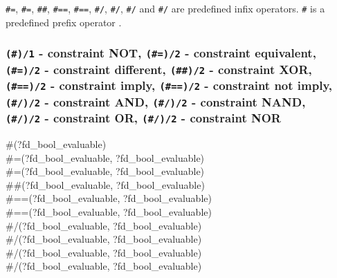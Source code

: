 \texttt{\#{\lt}={\gt}}, \texttt{\#{\bs}{\lt}={\gt}}, \texttt{\#\#},
\texttt{\#=={\gt}}, \texttt{\#{\bs}=={\gt}}, \texttt{\#/{\bs}},
\texttt{\#{\bs}/{\bs}}, \texttt{\#{\bs}/} and \texttt{\#{\bs}{\bs}/} are
predefined infix operators. \texttt{\#{\bs}} is a predefined prefix operator
.

\begin{PlErrors}




\end{PlErrors}

\subsubsection{\texttt{(\#{\bs})/1} - constraint NOT,
\texttt{(\#{\lt}={\gt})/2} - constraint equivalent, \\
\texttt{(\#{\bs}{\lt}={\gt})/2} - constraint different,
\texttt{(\#\#)/2} - constraint XOR, \\
\texttt{(\#=={\gt})/2} - constraint imply,
\texttt{(\#{\bs}=={\gt})/2} - constraint not imply, \\
\texttt{(\#/{\bs})/2} - constraint AND,
\texttt{(\#{\bs}/{\bs})/2} - constraint NAND, \\
\texttt{(\#{\bs}/)/2} - constraint OR,
\texttt{(\#{\bs}{\bs}/)/2} - constraint NOR}

\begin{TemplatesOneCol}
\#{\bs}(?fd\_bool\_evaluable)\\
\#{\lt}={\gt}(?fd\_bool\_evaluable, ?fd\_bool\_evaluable)\\
\#{\bs}{\lt}={\gt}(?fd\_bool\_evaluable, ?fd\_bool\_evaluable)\\
\#\#(?fd\_bool\_evaluable, ?fd\_bool\_evaluable)\\
\#=={\gt}(?fd\_bool\_evaluable, ?fd\_bool\_evaluable)\\
\#{\bs}=={\gt}(?fd\_bool\_evaluable, ?fd\_bool\_evaluable)\\
\#/{\bs}(?fd\_bool\_evaluable, ?fd\_bool\_evaluable)\\
\#{\bs}/{\bs}(?fd\_bool\_evaluable, ?fd\_bool\_evaluable)\\
\#{\bs}/(?fd\_bool\_evaluable, ?fd\_bool\_evaluable)\\
\#{\bs}{\bs}/(?fd\_bool\_evaluable, ?fd\_bool\_evaluable)

\end{TemplatesOneCol}

